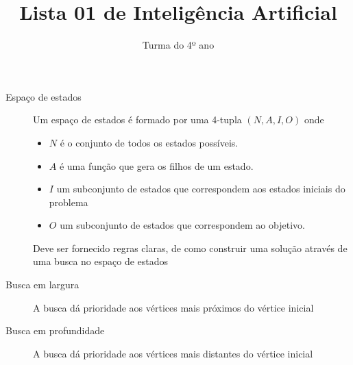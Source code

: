 \documentclass[12pt]{article}
\title{Lista 01 de Inteligência Artificial}
\date{}
\author{Turma do 4º ano}
\begin{document}
\maketitle

\begin{description}

\item[Espaço de estados]
Um espaço de estados é formado por uma 4-tupla $(N, A, I, O)$ onde
\begin{itemize}
\item $N$ é o conjunto de todos os estados possíveis.
\item $A$ é uma função que gera os filhos de um estado.
\item $I$ um subconjunto de estados que correspondem aos estados iniciais do problema
\item $O$ um subconjunto de estados que correspondem ao objetivo.
\end{itemize}
Deve ser fornecido regras claras, de como construir uma solução através de uma busca no espaço de estados

\item[Busca em largura]
A busca dá prioridade aos vértices mais próximos do vértice inicial

\item[Busca em profundidade]
A busca dá prioridade aos vértices mais distantes do vértice inicial

\end{description}

\break
\end{document}
